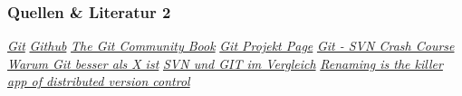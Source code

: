 \documentclass{beamer}
\begin{document}
\begin{frame}\frametitle{Quellen \& Literatur 2}
\begin{thebibliography}{9}
 \emph{\href{http://wiki.ubuntuusers.de/Git}{Git}}
 \emph{\href{https://github.com/features/projects}{Github}}
 \emph{\href{http://book.git-scm.com/index.html}{The Git Community Book}}
 \emph{\href{http://git-scm.com/}{Git Projekt Page}}
 \emph{\href{http://git.or.cz/course/svn.html}{Git - SVN Crash Course}}
 \emph{\href{http://de.whygitisbetterthanx.com/}{Warum Git besser als X ist}}
 \emph{\href{http://velian.dyndns.org/mediawiki/index.php/SVN\_und\_GIT\_im\_Vergleich}{SVN und GIT im Vergleich}}
 \emph{\href{http://www.markshuttleworth.com/archives/123}{Renaming is the killer app of distributed version control}}
\end{thebibliography}
\end{frame}
\end{document}
